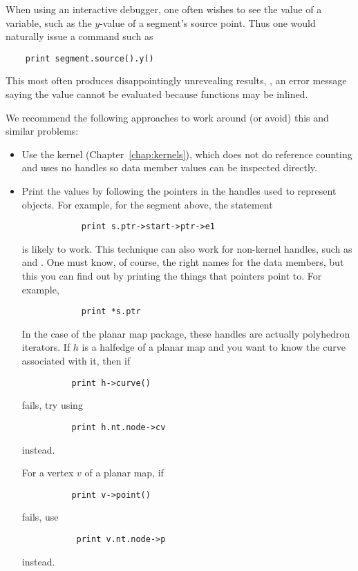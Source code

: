When using an interactive debugger, one often wishes to see the value of
a variable, such as the $y$-value of a segment's source point. Thus one
would naturally issue a command such as
\begin{verbatim}
    print segment.source().y()
\end{verbatim}
This most often produces disappointingly unrevealing results, \eg, an
error message saying the value cannot be evaluated because functions may
be inlined.  

We recommend the following approaches to work around (or avoid) this 
and similar problems:
\begin{itemize}
   \item Use the  kernel 
         (Chapter~\ref{chap:kernels}), which does not do reference
         counting and uses no handles so data member values can be inspected
         directly.
   \item Print the values by following the pointers in the handles used to 
         represent objects.  For example, for the segment above, the statement
         \begin{verbatim}
            print s.ptr->start->ptr->e1
         \end{verbatim}
         is likely to work.  This technique can also work for non-kernel 
         handles, such as  and .
         One must know, of course, the right names for the data members,
         but this you can find out by printing the things that pointers
         point to.   For example,
         \begin{verbatim}
            print *s.ptr
         \end{verbatim}
         In the case of the planar map package, these handles are actually 
         polyhedron iterators. 
         If $h$ is a halfedge of a planar map and you want to know the curve 
         associated with it, then if
         \begin{verbatim}
          print h->curve()
         \end{verbatim}
         fails, try using 
         \begin{verbatim}
          print h.nt.node->cv
         \end{verbatim}
         instead.

         For a vertex $v$ of a planar map, if 
         \begin{verbatim}
          print v->point()
         \end{verbatim}
         fails, use  
         \begin{verbatim}
           print v.nt.node->p
         \end{verbatim}
         instead.
\end{itemize}

